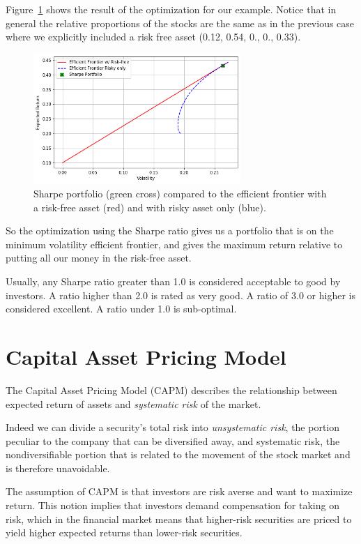 Figure~\ref{fig:sharpe_ratio} shows the result of the optimization for our example.    
Notice that in general the relative proportions of the stocks are the
same as in the previous case where we explicitly included a risk free
asset (0.12, 0.54, 0., 0., 0.33).

\begin{figure}[htb]
	\centering
	\includegraphics[width=0.7\textwidth]{figures/sharpe_ratio.png}
	\caption{Sharpe portfolio (green cross) compared to the efficient frontier with a risk-free asset (red) and with risky asset only (blue).}
	\label{fig:sharpe_ratio}
\end{figure}

So the optimization using the Sharpe ratio gives us a portfolio that is
on the minimum volatility efficient frontier, and gives the maximum
return relative to putting all our money in the risk-free asset.

Usually, any Sharpe ratio greater than 1.0 is considered acceptable to good by investors. A ratio higher than 2.0 is rated as very good. A ratio of 3.0 or higher is considered excellent. A ratio under 1.0 is sub-optimal.

\section{Capital Asset Pricing Model}
\label{sec:capm}
The Capital Asset Pricing Model (CAPM) describes the relationship between expected return of assets and \emph{systematic risk} of the market.

Indeed we can divide a security’s total risk into \emph{unsystematic risk}, the portion peculiar to the company that can be diversified away, and systematic risk, the nondiversifiable portion that is related to the movement of the stock market and is therefore unavoidable. 

The assumption of CAPM is that investors are risk averse and want to maximize return. This notion implies that investors demand compensation for taking on risk, which in the financial market means that higher-risk securities are priced to yield higher expected returns than lower-risk securities. 

